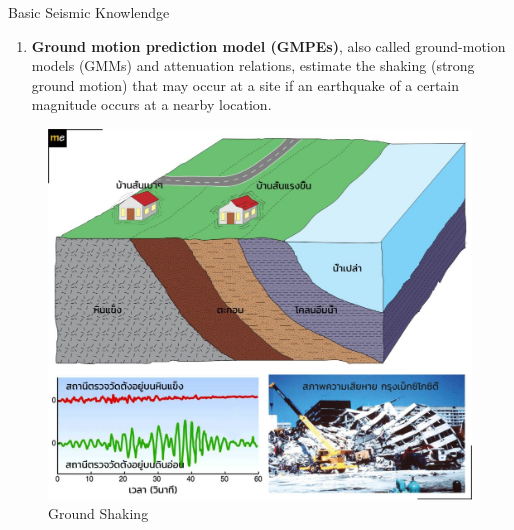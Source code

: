 \documentclass{beamer}
\newcounter{saveenumi}
\newcommand{\conti}{\setcounter{enumi}{\value{saveenumi}}}
\begin{document}
	\begin{frame}[t]{Basic Seismic Knowlendge}
		\begin{enumerate}
			\conti
			\item \textbf{Ground motion prediction model (GMPEs)}, also called ground-motion models 
			(GMMs) and attenuation relations, estimate the shaking (strong ground motion) that may occur 
			at a site if an earthquake of a certain magnitude occurs at a nearby location.
		\end{enumerate}
	
		\begin{figure}
			\centering
			\includegraphics[scale=0.5]{shak.jpg}
			\caption{Ground Shaking}
		\end{figure}
	\end{frame}
\end{document}
